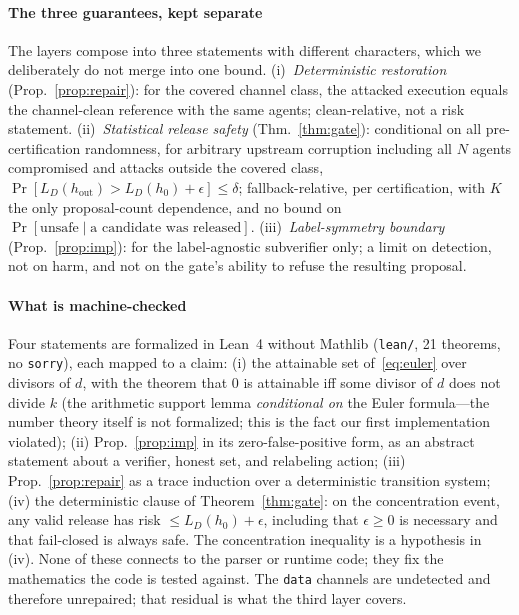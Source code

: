 \documentclass[conference]{IEEEtran}
\newcommand{\risk}[1]{L_D(#1)}
\begin{document}
\paragraph{The three guarantees, kept separate} The layers compose
into three statements with different characters, which we deliberately
do not merge into one bound. (i)~\emph{Deterministic restoration}
(Prop.~\ref{prop:repair}): for the covered channel class, the attacked
execution equals the channel-clean reference with the same agents;
clean-relative, not a risk statement. (ii)~\emph{Statistical release
safety} (Thm.~\ref{thm:gate}): conditional on all pre-certification
randomness, for arbitrary upstream corruption including all $N$ agents
compromised and attacks outside the covered class,
$\Pr[\risk{h_{\mathrm{out}}}>\risk{h_0}+\epsilon]\le\delta$;
fallback-relative, per certification, with $K$ the only
proposal-count dependence, and no bound on
$\Pr[\text{unsafe}\mid\text{a candidate was released}]$. (iii)~\emph{Label-symmetry
boundary} (Prop.~\ref{prop:imp}): for the label-agnostic subverifier
only; a limit on detection, not on harm, and not on the gate's ability
to refuse the resulting proposal.

\paragraph{What is machine-checked} Four statements are formalized in
Lean~4 without Mathlib (\texttt{lean/}, 21 theorems, no \texttt{sorry}),
each mapped to a claim: (i) the attainable set of~\eqref{eq:euler}
over divisors of $d$, with the theorem that $0$ is attainable iff some
divisor of $d$ does not divide $k$ (the arithmetic support lemma
\emph{conditional on} the Euler formula---the number theory itself is
not formalized; this is the fact our first implementation violated);
(ii) Prop.~\ref{prop:imp} in its zero-false-positive form, as an
abstract statement about a verifier, honest set, and relabeling
action; (iii) Prop.~\ref{prop:repair} as a trace induction over a
deterministic transition system; (iv) the deterministic clause of
Theorem~\ref{thm:gate}: on the concentration event, any valid release
has risk $\le\risk{h_0}+\epsilon$, including that $\epsilon\ge0$ is
necessary and that fail-closed is always safe. The concentration
inequality is a hypothesis in (iv). None of these connects to the
parser or runtime code; they fix the mathematics the code is tested
against. The \texttt{data} channels are
undetected and therefore unrepaired; that residual is what the third
layer covers.
\end{document}
